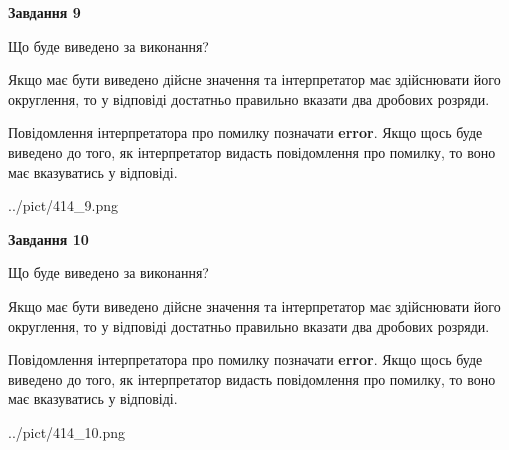 \documentclass[12pt, ukrainian]{article}
\begin{document}
{\begin {Large}
{\begin {center}\textbf{Завдання 9}\end {center}}\par
Що буде виведено за виконання? \par

Якщо має бути виведено дійсне значення та інтерпретатор має здійснювати його округлення, 
то у відповіді достатньо правильно вказати два дробових розряди.

Повідомлення інтерпретатора про помилку позначати \textbf{error}.
Якщо щось буде виведено до того, як інтерпретатор видасть повідомлення про помилку, 
то воно має вказуватись у відповіді. \par

\begin{center}
	{../pict/414_9.png}
\end{center}
\newpage

{\begin {center}\textbf{Завдання 10}\end {center}}\par
Що буде виведено за виконання? \par

Якщо має бути виведено дійсне значення та інтерпретатор має здійснювати його округлення, 
то у відповіді достатньо правильно вказати два дробових розряди.

Повідомлення інтерпретатора про помилку позначати \textbf{error}.
Якщо щось буде виведено до того, як інтерпретатор видасть повідомлення про помилку, 
то воно має вказуватись у відповіді. \par

\begin{center}
	{../pict/414_10.png}
\end{center}
\newpage

\end {Large}}
\end{document}
